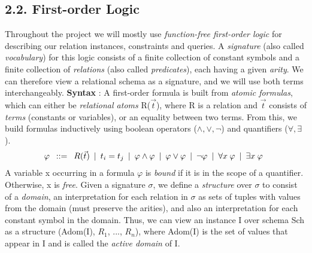 \documentclass[11pt, a4paper, dvipsnames]{article}
\begin{document}
\subsection{2.2. First-order Logic}
Throughout the project we will mostly use \textit{function-free first-order logic} for describing our relation instances, constraints and queries. A \textit{signature} (also called \textit{vocabulary}) for this logic consists of a finite collection of constant symbols and a finite collection of \textit{relations} (also called \textit{predicates}), each having a given \textit{arity}. We can therefore view a relational schema as a signature, and we will use both terms interchangeably. \newline
\textbf{Syntax} : A first-order formula is built from \textit{atomic formulas}, which can either be \textit{relational atoms} R($\vec{t}$), where R is a relation and $\vec{t}$ consists of \textit{terms} (constants or variables), or an equality between two terms. From this, we build formulas inductively using boolean operators ($\wedge, \vee, \neg$) and quantifiers ($\forall, \exists$).
\begin{gather*}
\varphi \hspace{0.5em} ::= \hspace{0.5em} R(\vec{t}) \hspace{0.5em} |\hspace{0.5em} t_{i} = t_{j} \hspace{0.5em}| \hspace{0.5em}\varphi \wedge \varphi \hspace{0.5em}| \hspace{0.5em}\varphi \vee \varphi \hspace{0.5em}| \hspace{0.5em}\neg \varphi \hspace{0.5em}| \hspace{0.5em}\forall x \hspace{0.25em} \varphi \hspace{0.5em}|\hspace{0.5em} \exists x \hspace{0.25em} \varphi\hspace{0.5em}
\end{gather*}
A variable x occurring in a formula $\varphi$ is \textit{bound} if it is in the scope of a quantifier. Otherwise, x is \textit{free}.\newline
Given a signature $\sigma$, we define a \textit{structure} over $\sigma$ to consist of a \textit{domain}, an interpretation for each relation in $\sigma$ as sets of tuples with values from the domain (must preserve the arities), and also an interpretation for each constant symbol in the domain. Thus, we can view an instance I over schema Sch as a structure (Adom(I), $R_{1}$, ..., $R_{n}$), where Adom(I) is the set of values that appear in I and is called the \textit{active domain} of I.\newline
\end{document}

